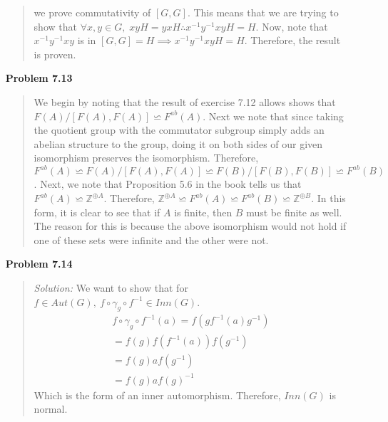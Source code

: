 \documentclass{article}
\newcommand{\Solution}{\textit{Solution: }}
\begin{document}
\begin{enumerate}
\begin{quote}
                we prove commutativity of $[G, G]$. This means that we are trying to show that $\forall x, y \in G, \;
                xyH = yxH \therefore x^{-1}y^{-1}xyH = H$. Now, note that $x^{-1}y^{-1}xy$ is in 
                $[G, G] = H \implies x^{-1}y^{-1}xyH = H$. Therefore, the result is proven. \qedsymbol
            \end{quote}
        \item[\textbf{Problem 7.13}]
            \begin{quote}
                We begin by noting that the result of exercise 7.12 allows shows that $F(A) / [F(A), F(A)] \backsimeq F^{ab}(A)$. 
                Next we note that since taking the quotient group with the commutator subgroup simply adds an abelian structure to 
                the group, doing it on both sides of our given isomorphism preserves the isomorphism. Therefore, 
                $F^{ab}(A) \backsimeq F(A) / [F(A), F(A)] \backsimeq F(B) / [F(B), F(B)] \backsimeq F^{ab}(B)$. Next, we note that
                Proposition 5.6 in the book tells us that $F^{ab}(A) \backsimeq \mathbb{Z}^{\oplus A}$. Therefore, 
                $\mathbb{Z}^{\oplus A} \backsimeq F^{ab}(A) \backsimeq F^{ab}(B) \backsimeq \mathbb{Z}^{\oplus B}$. In this form, it is clear to see that if $A$
                is finite, then $B$ must be finite as well. The reason for this is because the above isomorphism would not hold if one of
                these sets were infinite and the other were not. \qedsymbol
            \end{quote}
        \item[\textbf{Problem 7.14}]
            \begin{quote}
                \Solution We want to show that for $f \in Aut(G), \: f \circ \gamma_g \circ f^{-1} \in Inn(G)$.
                \begin{equation*}
                    \begin{gathered}
                        f \circ \gamma_g \circ f^{-1} (a) = f(gf^{-1}(a)g^{-1}) \\
                        = f(g)f(f^{-1}(a))f(g^{-1}) \\
                        = f(g)af(g^{-1}) \\
                        = f(g)af(g)^{-1}
                    \end{gathered}
                \end{equation*}
                Which is the form of an inner automorphism. Therefore, $Inn(G)$ is normal. \qedsymbol
            \end{quote}

\end{enumerate}
\end{document}
